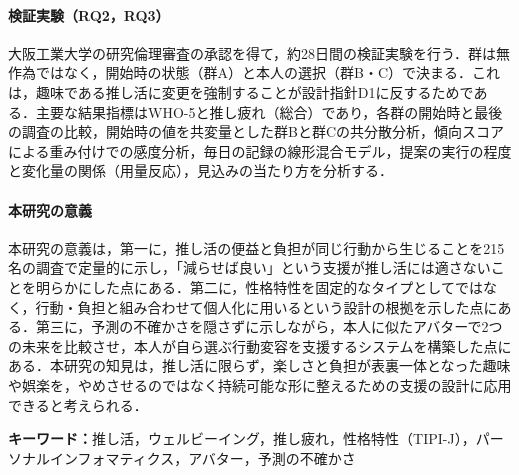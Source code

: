 \paragraph{検証実験（RQ2，RQ3）}
大阪工業大学の研究倫理審査の承認を得て，約28日間の検証実験を行う．群は無作為ではなく，開始時の状態（群A）と本人の選択（群B・C）で決まる．これは，趣味である推し活に変更を強制することが設計指針D1に反するためである．主要な結果指標はWHO-5と推し疲れ（総合）であり，各群の開始時と最後の調査の比較，開始時の値を共変量とした群Bと群Cの共分散分析，傾向スコアによる重み付けでの感度分析，毎日の記録の線形混合モデル，提案の実行の程度と変化量の関係（用量反応），見込みの当たり方を分析する．

\paragraph{本研究の意義}
本研究の意義は，第一に，推し活の便益と負担が同じ行動から生じることを215名の調査で定量的に示し，「減らせば良い」という支援が推し活には適さないことを明らかにした点にある．第二に，性格特性を固定的なタイプとしてではなく，行動・負担と組み合わせて個人化に用いるという設計の根拠を示した点にある．第三に，予測の不確かさを隠さずに示しながら，本人に似たアバターで2つの未来を比較させ，本人が自ら選ぶ行動変容を支援するシステムを構築した点にある．本研究の知見は，推し活に限らず，楽しさと負担が表裏一体となった趣味や娯楽を，やめさせるのではなく持続可能な形に整えるための支援の設計に応用できると考えられる．

\vspace{1em}
\noindent\textbf{キーワード：}推し活，ウェルビーイング，推し疲れ，性格特性（TIPI-J），パーソナルインフォマティクス，アバター，予測の不確かさ
